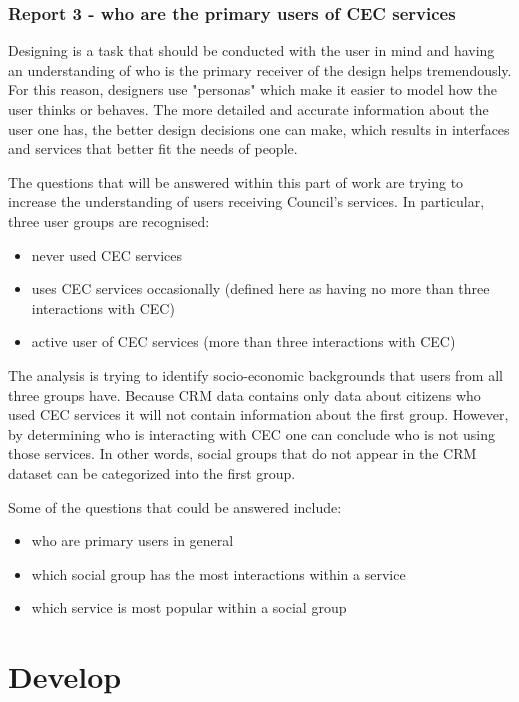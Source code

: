 			\subsubsection{Report 3 - who are the primary users of CEC services}
			
Designing is a task that should be conducted with the user in mind and having an understanding of who is the primary receiver of the design helps tremendously. For this reason, designers use "personas" which make it easier to model how the user thinks or behaves. The more detailed and accurate information about the user one has, the  better design decisions one can make, which results in interfaces and services that better fit the needs of people.

The questions that will be answered within this part of work are trying to increase the understanding of users receiving Council's services. In particular, three user groups are recognised:
\begin{itemize}
\item never used CEC services
\item uses CEC services occasionally (defined here as having no more than three interactions with CEC)
\item active user of CEC services (more than three interactions with CEC)
\end{itemize}

The analysis is trying to identify socio-economic backgrounds that users from all three groups have. Because CRM data contains only data about citizens who used CEC services it will not contain information about the first group. However, by determining who is interacting with CEC one can conclude who is not using those services. In other words, social groups that do not appear in the CRM dataset can be categorized into the first group.

Some of the questions that could be answered include:
\begin{itemize}
\item who are primary users in general
\item which social group has the most interactions within a service
\item which service is most popular within a social group
\end{itemize}

	\section{Develop}
	
